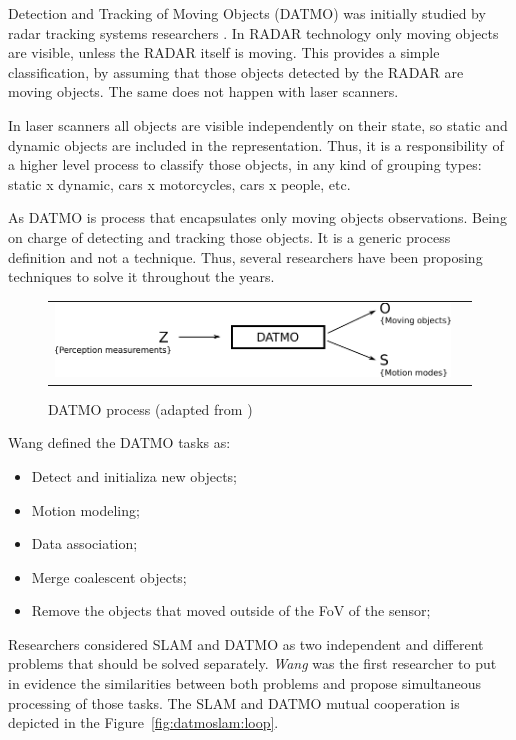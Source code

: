 Detection and Tracking of Moving Objects (DATMO) was initially studied by radar tracking systems researchers \cite{qadeerthesis}. In RADAR technology only moving objects are visible, unless the RADAR itself is moving. This provides a simple classification, by assuming that those objects detected by the RADAR are moving objects. The same does not happen with laser scanners. 

In laser scanners all objects are visible independently on their state, so static and dynamic objects are included in the representation. Thus, it is a responsibility of a higher level process to classify those objects, in any kind of grouping types: static x dynamic, cars x motorcycles, cars x people, etc.

As DATMO is process that encapsulates only moving objects observations. Being on charge of detecting and tracking those objects. It is a generic process definition and not a technique. Thus, several researchers have been proposing techniques to solve it throughout the years.

\begin{figure}[h]
   \centering
     \begin{tabular}{lr}
       \includegraphics[scale=1.0]{img/fig:datmo:process}
     \end{tabular}
   \caption{DATMO process (adapted from \cite{Wang04a})}
   \label{fig:datmo:process}
 \end{figure}

Wang \cite{Wang03onlinesimultaneous} defined the DATMO tasks as:

\begin{itemize}
\item Detect and initializa new objects;
\item Motion modeling;
\item Data association;
\item Merge coalescent objects;
\item Remove the objects that moved outside of the FoV of the sensor;
\end{itemize}

Researchers considered SLAM and DATMO as two independent and different problems that should be solved separately. \textit{Wang} was the first researcher to put in evidence the similarities between both problems and propose simultaneous processing of those tasks\cite{Wang03onlinesimultaneous}. The SLAM and DATMO mutual cooperation is depicted in the Figure~\ref{fig:datmoslam:loop}.

